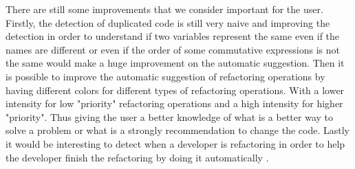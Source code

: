 There are still some improvements that we consider important for the user.
Firstly, the detection of duplicated code is still very naive and improving the detection in order to understand if
two variables represent the same even if the names are different or even if the
 order of some commutative expressions is not the same would make a huge improvement
 on the automatic suggestion.
Then it is possible to improve the automatic suggestion of refactoring operations by
having different colors for different types of refactoring operations.
With a lower intensity for low "priority" refactoring operations and a high intensity
for higher "priority". Thus giving the user a better knowledge of what is a better
way to solve a problem or what is a strongly recommendation to change the code.
Lastly it would be interesting to detect when a developer is refactoring in order to help the developer finish the
refactoring by doing it automatically \cite{ge2012reconciling}.
